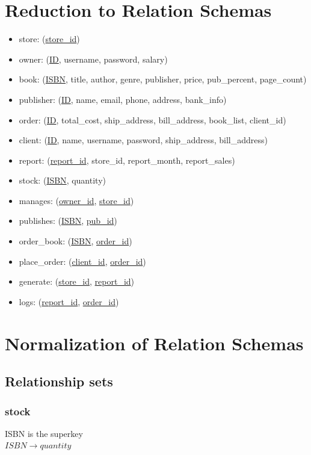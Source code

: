 \documentclass[Project Report]{article}
\begin{document}
\section{Reduction to Relation Schemas}
\begin{itemize}
    \item store: (\underline{store\_id})
    \item owner: (\underline{ID}, username, password, salary)
    \item book: (\underline{ISBN}, title, author, genre, publisher, price, pub\_percent, page\_count)
    \item publisher: (\underline{ID}, name, email, phone, address, bank\_info)
    \item order: (\underline{ID}, total\_cost, ship\_address, bill\_address, book\_list, client\_id)
    \item client: (\underline{ID}, name, username, password, ship\_address, bill\_address)
    \item report: (\underline{report\_id}, store\_id, report\_month, report\_sales)
    \item stock: (\underline{ISBN}, quantity)
    \item manages: (\underline{owner\_id}, \underline{store\_id})
    \item publishes: (\underline{ISBN}, \underline{pub\_id})
    \item order\_book: (\underline{ISBN}, \underline{order\_id})
    \item place\_order: (\underline{client\_id}, \underline{order\_id})
    \item generate: (\underline{store\_id}, \underline{report\_id})
    \item logs: (\underline{report\_id}, \underline{order\_id})
\end{itemize}

\section{Normalization of Relation Schemas}

\subsection{Relationship sets}

\subsubsection{stock}
ISBN is the superkey\\
$ISBN \rightarrow quantity$
\end{document}
